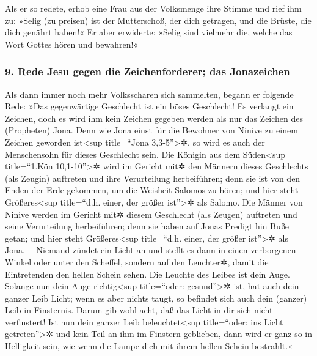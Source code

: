  Als er so redete, erhob eine Frau aus der Volksmenge
ihre Stimme und rief ihm zu: »Selig (zu preisen) ist der Mutterschoß,
der dich getragen, und die Brüste, die dich genährt haben!«
 Er aber erwiderte: »Selig sind vielmehr die, welche das
Wort Gottes hören und bewahren!«

\hypertarget{rede-jesu-gegen-die-zeichenforderer-das-jonazeichen}{%
\subsubsection{9. Rede Jesu gegen die Zeichenforderer; das
Jonazeichen}\label{rede-jesu-gegen-die-zeichenforderer-das-jonazeichen}}

 Als dann immer noch mehr Volksscharen sich sammelten,
begann er folgende Rede: »Das gegenwärtige Geschlecht ist ein böses
Geschlecht! Es verlangt ein Zeichen, doch es wird ihm kein Zeichen
gegeben werden als nur das Zeichen des (Propheten) Jona. 
Denn wie Jona einst für die Bewohner von Ninive zu einem Zeichen
geworden ist\textless sup title=``Jona 3,3-5''\textgreater✲, so wird es
auch der Menschensohn für dieses Geschlecht sein.  Die
Königin aus dem Süden\textless sup title=``1.Kön 10,1-10''\textgreater✲
wird im Gericht mit✲ den Männern dieses Geschlechts (als Zeugin)
auftreten und ihre Verurteilung herbeiführen; denn sie ist von den Enden
der Erde gekommen, um die Weisheit Salomos zu hören; und hier steht
Größeres\textless sup title=``d.h. einer, der größer ist''\textgreater✲
als Salomo.  Die Männer von Ninive werden im Gericht mit✲
diesem Geschlecht (als Zeugen) auftreten und seine Verurteilung
herbeiführen; denn sie haben auf Jonas Predigt hin Buße getan; und hier
steht Größeres\textless sup title=``d.h. einer, der größer
ist''\textgreater✲ als Jona.~--  Niemand zündet ein Licht
an und stellt es dann in einen verborgenen Winkel oder unter den
Scheffel, sondern auf den Leuchter✲, damit die Eintretenden den hellen
Schein sehen.  Die Leuchte des Leibes ist dein Auge.
Solange nun dein Auge richtig\textless sup title=``oder:
gesund''\textgreater✲ ist, hat auch dein ganzer Leib Licht; wenn es aber
nichts taugt, so befindet sich auch dein (ganzer) Leib in Finsternis.
 Darum gib wohl acht, daß das Licht in dir sich nicht
verfinstert!  Ist nun dein ganzer Leib
beleuchtet\textless sup title=``oder: ins Licht getreten''\textgreater✲
und kein Teil an ihm im Finstern geblieben, dann wird er ganz so in
Helligkeit sein, wie wenn die Lampe dich mit ihrem hellen Schein
bestrahlt.«

